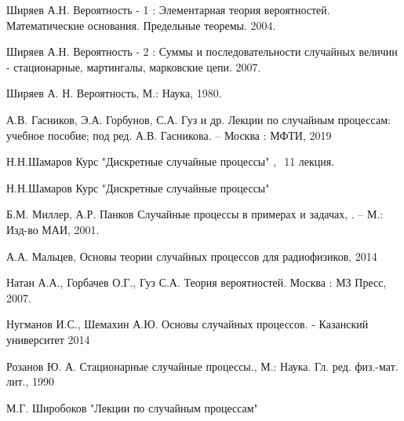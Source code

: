 \newpage


\newpage



\newpage


\newpage



\newpage
\begin{thebibliography}{}
	 Ширяев А.Н. Вероятность - 1 : Элементарная теория вероятностей. Математические основания. Предельные теоремы. 2004.
	
	 Ширяев А.Н. Вероятность - 2 : Суммы и последовательности случайных величин - стационарные, мартингалы, марковские цепи. 2007.
	
	 Ширяев А. Н. Вероятность, М.: Наука, 1980.
	
	 А.В. Гасников, Э.А. Горбунов, С.А. Гуз и др. Лекции по случайным процессам: учебное пособие; под ред. А.В. Гасникова. – Москва : МФТИ, 2019 
	
	 Н.Н.Шамаров Курс "Дискретные случайные процессы" $,~$ 11 лекция.
	
	 Н.Н.Шамаров Курс "Дискретные случайные процессы"
	
	 Б.М. Миллер, А.Р. Панков Случайные процессы в примерах и задачах, . -- М.: Изд-во МАИ, 2001.
	
	 А.А. Мальцев, Основы теории случайных процессов для радиофизиков, 2014
	
	 Натан А.А., Горбачев О.Г., Гуз С.А. Теория вероятностей. Москва : МЗ Пресс, 2007.
	
	 Нугманов И.С., Шемахин А.Ю. Основы случайных процессов. - Казанский университет 2014
	
	 Розанов Ю. А. Стационарные случайные процессы., М.: Наука. Гл. ред. физ.-мат. лит., 1990
	
	 М.Г. Широбоков "Лекции по случайным процессам"
	

\end{thebibliography}
